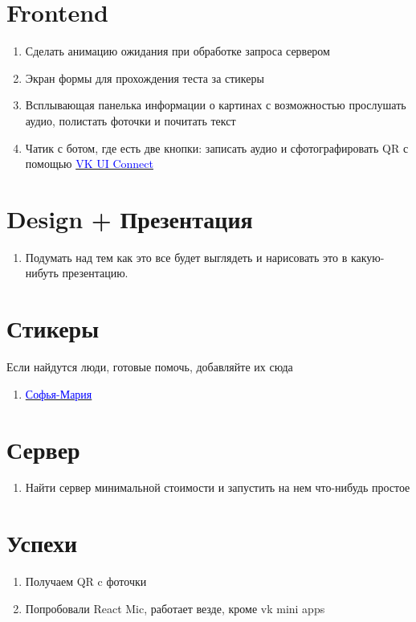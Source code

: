 \documentclass[11pt]{article}
\begin{document}
\section{Frontend}
\begin{enumerate}
\item Сделать анимацию ожидания при обработке запроса сервером 

\item  Экран формы для прохождения теста за стикеры

\item Всплывающая панелька информации о картинах с возможностью прослушать аудио, полистать фоточки и почитать текст

\item Чатик с ботом, где есть две кнопки:  записать аудио и сфотографировать QR с помощью  \href{https://vk.com/dev/vk_apps_docs}{\textcolor{blue}{VK UI Connect}}
\end{enumerate}
\section{Design + Презентация}
\begin{enumerate}

\item  Подумать над тем как это все будет выглядеть и нарисовать это в какую-нибуть презентацию.


\end{enumerate}
\section{Стикеры}

Если найдутся люди, готовые помочь,  добавляйте их сюда
\begin{enumerate}

\item \href{https://vk.com/sofiamarid_art}{\textcolor{blue}{Софья-Мария}}

\end{enumerate}
\section{Сервер}

\begin{enumerate}

\item Найти сервер минимальной стоимости и запустить на нем что-нибудь простое 

\end{enumerate}

\section*{Успехи}

\begin{enumerate}
\item Получаем QR c фоточки
\item Попробовали React Mic, работает везде, кроме vk mini apps
\end{enumerate}
 
\end{document}
